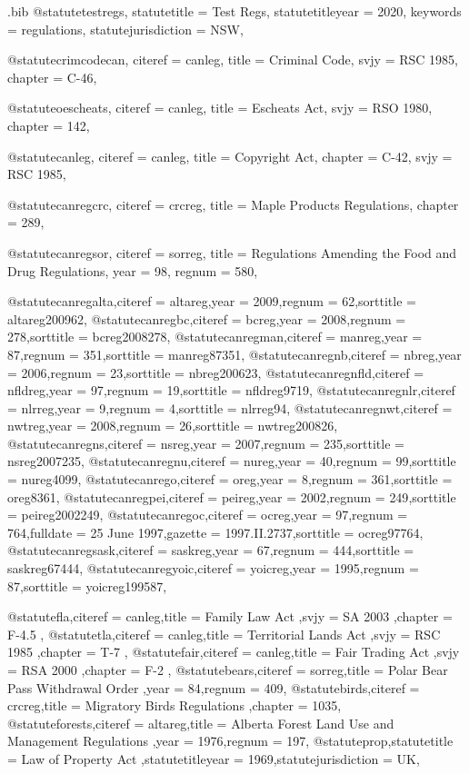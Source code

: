 \begin{filecontents*}{\jobname.bib}
@statute{testregs,
statutetitle = {Test Regs},
statutetitleyear = {2020},%
keywords = {regulations},
statutejurisdiction = {NSW},
}




@statute{crimcodecan,
citeref = {canleg},
title = {Criminal Code},
svjy = {RSC 1985},
chapter = {C-46},
}


@statute{oescheats,
citeref = {canleg},
title = {Escheats Act},
svjy = {RSO 1980},
chapter = {142},
}

@statute{canleg,
citeref = {canleg},
title = {Copyright Act},
chapter = {C-42},
svjy = {RSC 1985},
}

@statute{canregcrc,
citeref = {crcreg},
title = {Maple Products Regulations},
chapter = {289},
}


@statute{canregsor,
citeref = {sorreg},
title = {Regulations Amending the Food and Drug Regulations},
year = {98},
regnum = {580},
}

@statute{canregalta,citeref = {altareg},year = {2009},regnum = {62},sorttitle = {altareg200962},}
@statute{canregbc,citeref = {bcreg},year = {2008},regnum = {278},sorttitle = {bcreg2008278},}
@statute{canregman,citeref = {manreg},year = {87},regnum = {351},sorttitle = {manreg87351},}
@statute{canregnb,citeref = {nbreg},year = {2006},regnum = {23},sorttitle = {nbreg200623},}
@statute{canregnfld,citeref = {nfldreg},year = {97},regnum = {19},sorttitle = {nfldreg9719},}
@statute{canregnlr,citeref = {nlrreg},year = {9},regnum = {4},sorttitle = {nlrreg94},}
@statute{canregnwt,citeref = {nwtreg},year = {2008},regnum = {26},sorttitle = {nwtreg200826},}
@statute{canregns,citeref = {nsreg},year = {2007},regnum = {235},sorttitle = {nsreg2007235},}
@statute{canregnu,citeref = {nureg},year = {40},regnum = {99},sorttitle = {nureg4099},}
@statute{canrego,citeref = {oreg},year = {8},regnum = {361},sorttitle = {oreg8361},}
@statute{canregpei,citeref = {peireg},year = {2002},regnum = {249},sorttitle = {peireg2002249},}
@statute{canregoc,citeref = {ocreg},year = {97},regnum = {764},fulldate = {25 June 1997},gazette = { 1997.II.2737},sorttitle = {ocreg97764},}
@statute{canregsask,citeref = {saskreg},year = {67},regnum = {444},sorttitle = {saskreg67444},}
@statute{canregyoic,citeref = {yoicreg},year = {1995},regnum = {87},sorttitle = {yoicreg199587},}


@statute{fla,citeref = {canleg},title = {Family Law Act },svjy = {SA 2003 },chapter = {F-4.5 },}
@statute{tla,citeref = {canleg},title = {Territorial Lands Act },svjy = {RSC 1985 },chapter = {T-7 },}
@statute{fair,citeref = {canleg},title = {Fair Trading Act },svjy = {RSA 2000 },chapter = {F-2 },}
@statute{bears,citeref = {sorreg},title = {Polar Bear Pass Withdrawal Order },year = {84},regnum = {409},}
@statute{birds,citeref = {crcreg},title = {Migratory Birds Regulations },chapter = {1035},}
@statute{forests,citeref = {altareg},title = {Alberta Forest Land Use and Management Regulations },year = {1976},regnum = {197},}
@statute{prop,statutetitle = {Law of Property Act },statutetitleyear = {1969},statutejurisdiction = {UK},}


\end{filecontents*}
